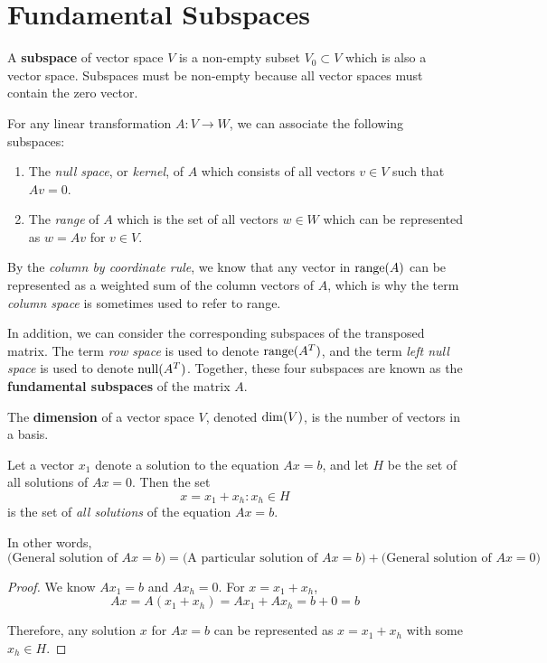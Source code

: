 \section{Fundamental Subspaces}

\begin{definition}
A \textbf{subspace} of vector space $V$ is a non-empty subset $V_{0} \subset V$ which is also a vector space. Subspaces must be non-empty because all vector spaces must contain the zero vector. 
\end{definition}

For any linear transformation $A : V \rightarrow W$, we can associate the following subspaces: 
\begin{enumerate}
	\item The \textit{null space}, or \textit{kernel}, of $A$ which consists of all vectors $v \in V$ such that $Av = 0$. 
	\item The \textit{range} of $A$ which is the set of all vectors $w \in W$ which can be represented as $w = Av$ for $v \in V$. 
\end{enumerate}

By the \textit{column by coordinate rule}, we know that any vector in $\operatorname{range}(A)$ can be represented as a weighted sum of the column vectors of $A$, which is why the term \textit{column space} is sometimes used to refer to range. 

In addition, we can consider the corresponding subspaces of the transposed matrix. The term \textit{row space} is used to denote $\operatorname{range}(A^{T})$, and the term \textit{left null space} is used to denote $\operatorname{null}(A^{T})$. Together, these four subspaces are known as the \textbf{fundamental subspaces} of the matrix $A$. 

\begin{definition}
The \textbf{dimension} of a vector space $V$, denoted $\operatorname{dim}(V)$, is the number of vectors in a basis. 
\end{definition}

\begin{theorem} 
Let a vector $x_{1}$ denote a solution to the equation $Ax = b$, and let $H$ be the set of all solutions of $Ax = 0$. Then the set
$$x = x_{1} + x_{h} : x_{h} \in H$$
is the set of \textit{all solutions} of the equation $Ax = b$. 

In other words, 
$$\Big(\text{General solution of $Ax=b$}\Big) = \Big(\text{A particular solution of $Ax=b$}\Big) + \Big(\text{General solution of $Ax=0$}\Big)$$
\end{theorem}
\begin{proof}
We know $Ax_{1} = b$ and $Ax_{h} = 0$. For $x = x_{1} + x_{h}$,
$$Ax = A(x_{1} + x_{h}) = Ax_{1} + Ax_{h} = b + 0 = b$$

Therefore, any solution $x$ for $Ax = b$ can be represented as $x = x_{1} + x_{h}$ with some $x_{h} \in H$. 
\end{proof}

